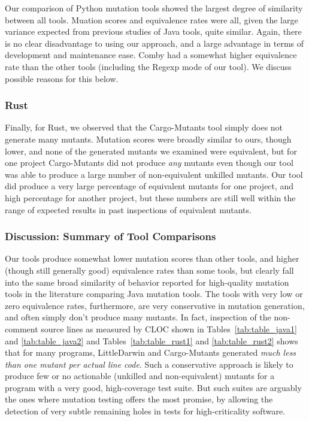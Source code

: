 \documentclass[sigconf,review, anonymous]{acmart}
\begin{document}
Our comparison of Python mutation tools showed the largest degree of
similarity between all tools.  Muation scores and equivalence rates
were all, given the large variance expected from previous studies of
Java tools, quite similar.  Again, there is no clear disadvantage to
using our approach, and a large advantage in terms of development and
maintenance ease.  Comby had a somewhat higher equivalence rate than the
other tools (including the Regexp mode of our tool).  We discuss
possible reasons for this below.

\subsubsection{Rust}

Finally, for Rust, we observed that the Cargo-Mutants tool simply does
not generate many mutants.  Mutation scores were broadly similar to
ours, though lower, and none of the generated mutants we examined were
equivalent, but for one project Cargo-Mutants did not produce
\emph{any} mutants even though our tool was able to produce a large
number of non-equivalent unkilled mutants.  Our tool did produce a
very large percentage of equivalent mutants for one project, and high
percentage for another project, but these numbers are still well
within the range of expected results in past inspections of
equivalent mutants.

\subsubsection{Discussion: Summary of Tool Comparisons}

Our tools produce somewhat lower mutation scores than other tools, and
higher (though still generally good) equivalence rates than some
tools, but clearly fall into the same broad similarity of behavior
reported for high-quality mutation tools in the literature comparing
Java mutation tools.   The tools with very low or zero equivalence rates, furthermore,
are very conservative in mutation generation, and often simply don't
produce many mutants.  In fact, inspection of the non-comment source
lines as measured by CLOC shown in Tables~\ref{tab:table_java1} and
\ref{tab:table_java2} and Tables~\ref{tab:table_rust1} and
\ref{tab:table_rust2} shows that for many programs, LittleDarwin and
Cargo-Mutants generated \emph{much less than one mutant per actual
  line code}.  Such a conservative approach is likely to produce few
or no actionable (unkilled and non-equivalent) mutants for a program
with a very good, high-coverage test suite.  But such suites are
arguably the ones where mutation testing offers the most promise, by
allowing the detection of very subtle remaining holes in tests for
high-criticality software.
\end{document}
